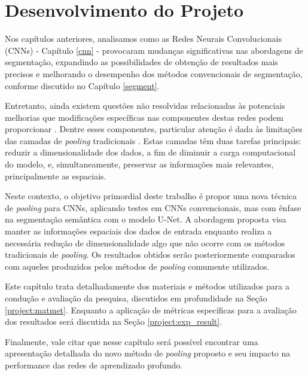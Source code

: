 \newpage
\clearpage

\section{Desenvolvimento do Projeto}
\label{project}

Nos capítulos anteriores, analisamos como as Redes Neurais Convolucionais (CNNs) - Capítulo \ref{cnn} - provocaram mudanças significativas nas abordagens de segmentação, expandindo as possibilidades de obtenção de resultados mais precisos e melhorando o desempenho dos métodos convencionais de segmentação, conforme discutido no Capítulo \ref{segment}.

Entretanto, ainda existem questões não resolvidas relacionadas às potenciais melhorias que modificações específicas nas componentes destas redes podem proporcionar \citep{AsgariTaghanaki2021DeepReview}. Dentre esses componentes, particular atenção é dada às limitações das camadas de \textit{pooling} tradicionais \citep{Liu2019Multi-LevelNetworks, He2015SpatialRecognition}. Estas camadas têm duas tarefas principais: reduzir a dimensionalidade dos dados, a fim de diminuir a carga computacional do modelo, e, simultaneamente, preservar as informações mais relevantes, principalmente as espaciais.

Neste contexto, o objetivo primordial deste trabalho é propor uma nova técnica de \textit{pooling} para CNNs, aplicando testes em CNNs convencionais, mas com ênfase na segmentação semântica com o modelo U-Net. A abordagem proposta visa manter as informações espaciais dos dados de entrada enquanto realiza a necessária redução de dimensionalidade algo que não ocorre com os métodos tradicionais de \textit{pooling}. Os resultados obtidos serão posteriormente comparados com aqueles produzidos pelos métodos de \textit{pooling} comumente utilizados.

Este capítulo trata detalhadamente dos materiais e métodos utilizados para a condução e avaliação da pesquisa, discutidos em profundidade na Seção \ref{project:matmet}. Enquanto a aplicação de métricas específicas para a avaliação dos resultados será discutida na Seção \ref{project:exp_result}.

Finalmente, vale citar que nesse capítulo será possível encontrar uma apresentação detalhada do novo método de \textit{pooling} proposto e seu impacto na performance das redes de aprendizado profundo.


